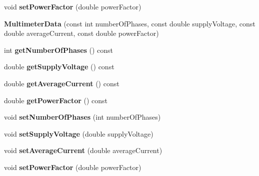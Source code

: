 \begin{DoxyCompactItemize}
\item 
\mbox{\label{class_multimeter_data_a9d78c63369331a8a45ec24539e3f7bfb}} 
void {\bfseries set\+Power\+Factor} (double power\+Factor)
\item 
\mbox{\label{class_multimeter_data_aad9049a845612672bdf114fc515fd488}} 
{\bfseries Multimeter\+Data} (const int number\+Of\+Phases, const double supply\+Voltage, const double average\+Current, const double power\+Factor)
\item 
\mbox{\label{class_multimeter_data_ad254f94068e4a116a416aa5411415a7c}} 
int {\bfseries get\+Number\+Of\+Phases} () const
\item 
\mbox{\label{class_multimeter_data_a0a880bb110d60cbc681a9b696bf33d6c}} 
double {\bfseries get\+Supply\+Voltage} () const
\item 
\mbox{\label{class_multimeter_data_a45921cedcf2e730657f9a0fd7c1f9517}} 
double {\bfseries get\+Average\+Current} () const
\item 
\mbox{\label{class_multimeter_data_a5bd2f9e3fc4c0bcb88dddff2d9c93a8f}} 
double {\bfseries get\+Power\+Factor} () const
\item 
\mbox{\label{class_multimeter_data_a0fdfbdf0caf5cbdd8ce71db1fd229dda}} 
void {\bfseries set\+Number\+Of\+Phases} (int number\+Of\+Phases)
\item 
\mbox{\label{class_multimeter_data_a34fdca356ce74e92d8ae9128c39f76ff}} 
void {\bfseries set\+Supply\+Voltage} (double supply\+Voltage)
\item 
\mbox{\label{class_multimeter_data_a396eae0c1fb9b97372627585dc8475d8}} 
void {\bfseries set\+Average\+Current} (double average\+Current)
\item 
\mbox{\label{class_multimeter_data_a9d78c63369331a8a45ec24539e3f7bfb}} 
void {\bfseries set\+Power\+Factor} (double power\+Factor)
\item 
\mbox{\label{class_multimeter_data_aad9049a845612672bdf114fc515fd488}} 

\end{DoxyCompactItemize}
